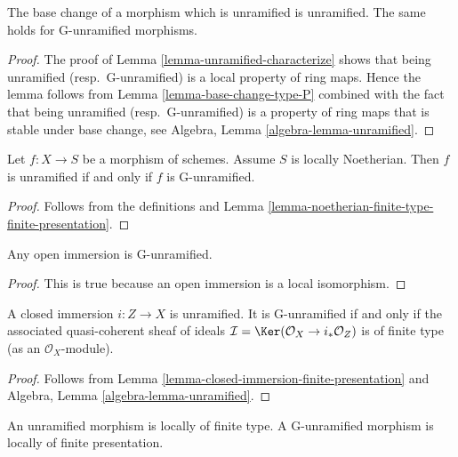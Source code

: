 \begin{lemma}
\label{lemma-base-change-unramified}
The base change of a morphism which is unramified is unramified.
The same holds for G-unramified morphisms.
\end{lemma}

\begin{proof}
The proof of Lemma \ref{lemma-unramified-characterize}
shows that being unramified (resp.\ G-unramified)
is a local property of ring maps. Hence the lemma follows from
Lemma \ref{lemma-base-change-type-P} combined
with the fact that being unramified (resp.\ G-unramified)
is a property of ring maps that is stable under base change, see
Algebra, Lemma \ref{algebra-lemma-unramified}.
\end{proof}

\begin{lemma}
\label{lemma-noetherian-unramified}
Let $f : X \to S$ be a morphism of schemes. Assume $S$ is locally Noetherian.
Then $f$ is unramified if and only if $f$ is G-unramified.
\end{lemma}

\begin{proof}
Follows from the definitions and
Lemma \ref{lemma-noetherian-finite-type-finite-presentation}.
\end{proof}


\begin{lemma}
\label{lemma-open-immersion-unramified}
Any open immersion is G-unramified.
\end{lemma}

\begin{proof}
This is true because an open immersion is a local isomorphism.
\end{proof}

\begin{lemma}
\label{lemma-closed-immersion-unramified}
A closed immersion $i : Z \to X$ is unramified.
It is G-unramified if and only if the associated quasi-coherent sheaf of
ideals $\mathcal{I} = \Ker(\mathcal{O}_X \to i_*\mathcal{O}_Z)$
is of finite type (as an $\mathcal{O}_X$-module).
\end{lemma}

\begin{proof}
Follows from Lemma \ref{lemma-closed-immersion-finite-presentation} and
Algebra, Lemma \ref{algebra-lemma-unramified}.
\end{proof}

\begin{lemma}
\label{lemma-unramified-locally-finite-type}
An unramified morphism is locally of finite type.
A G-unramified morphism is locally of finite presentation.
\end{lemma}

